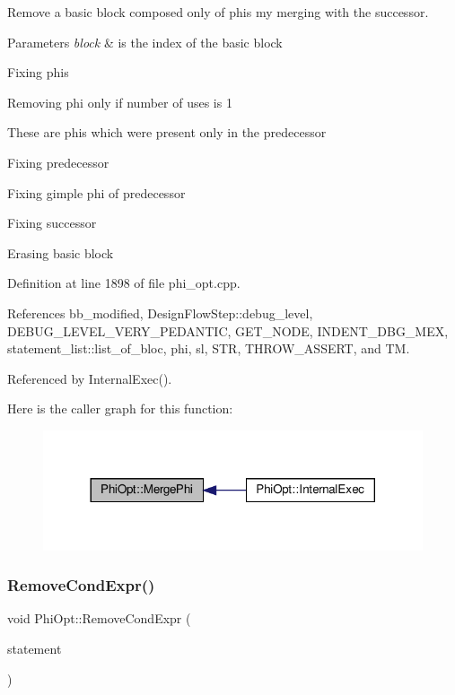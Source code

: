 Remove a basic block composed only of phis my merging with the successor. 


\begin{DoxyParams}{Parameters}
{\em block} & is the index of the basic block \\
\hline
\end{DoxyParams}
Fixing phis

Removing phi only if number of uses is 1

These are phis which were present only in the predecessor

Fixing predecessor

Fixing gimple phi of predecessor

Fixing successor

Erasing basic block 

Definition at line 1898 of file phi\+\_\+opt.\+cpp.



References bb\+\_\+modified, Design\+Flow\+Step\+::debug\+\_\+level, D\+E\+B\+U\+G\+\_\+\+L\+E\+V\+E\+L\+\_\+\+V\+E\+R\+Y\+\_\+\+P\+E\+D\+A\+N\+T\+IC, G\+E\+T\+\_\+\+N\+O\+DE, I\+N\+D\+E\+N\+T\+\_\+\+D\+B\+G\+\_\+\+M\+EX, statement\+\_\+list\+::list\+\_\+of\+\_\+bloc, phi, sl, S\+TR, T\+H\+R\+O\+W\+\_\+\+A\+S\+S\+E\+RT, and TM.



Referenced by Internal\+Exec().

Here is the caller graph for this function\+:
\nopagebreak
\begin{figure}[H]
\begin{center}
\leavevmode
\includegraphics[width=317pt]{dc/ddf/classPhiOpt_a8a350fb310bb1fccdc1be60e764c994f_icgraph}
\end{center}
\end{figure}
\mbox{\label{classPhiOpt_adf758836dc1fb94b9dacdb0c44e04b8c}} 
\subsubsection{\texorpdfstring{Remove\+Cond\+Expr()}{RemoveCondExpr()}}
{\footnotesize\ttfamily void Phi\+Opt\+::\+Remove\+Cond\+Expr (\begin{DoxyParamCaption}\item[{const \hyperlink{tree__node_8hpp_a6ee377554d1c4871ad66a337eaa67fd5}{tree\+\_\+node\+Ref}}]{statement }\end{DoxyParamCaption})\hspace{0.3cm}{\ttfamily [private]}}



